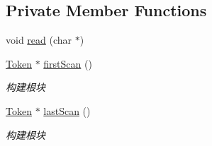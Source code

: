 \subsection*{Private Member Functions}
\begin{DoxyCompactItemize}
\item 
void \hyperlink{class_lexer_abb0f5b7f1e6fd685c8c8e9074553c67f}{read} (char $\ast$)
\item 
\mbox{\label{class_lexer_aa5f52af80cfc8de7841d2ac6bc736662}} 
\hyperlink{class_token}{Token} $\ast$ \hyperlink{class_lexer_aa5f52af80cfc8de7841d2ac6bc736662}{first\+Scan} ()
\begin{DoxyCompactList}\small\item\em 构建根块 \end{DoxyCompactList}\item 
\mbox{\label{class_lexer_a28eb3e3a349bcbc7a0b03e16bb42192f}} 
\hyperlink{class_token}{Token} $\ast$ \hyperlink{class_lexer_a28eb3e3a349bcbc7a0b03e16bb42192f}{last\+Scan} ()
\begin{DoxyCompactList}\small\item\em 构建根块 \end{DoxyCompactList}\end{DoxyCompactItemize}
